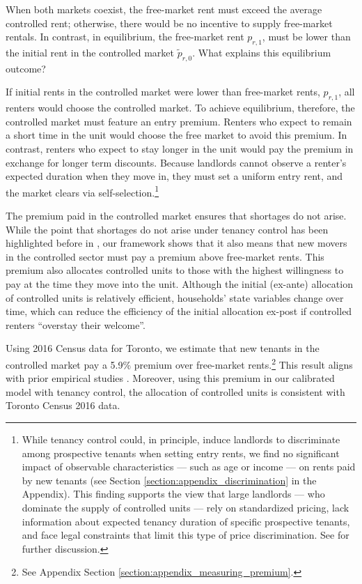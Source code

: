 \documentclass[parskip=full]{article}
\begin{document}
When both markets coexist, the free-market rent must exceed the average controlled rent; otherwise, there would be no incentive to supply free-market rentals. In contrast, in equilibrium, the free-market rent $p_{r,1}$, must be lower than the initial rent in the controlled market $\tilde{p}_{r,0}$. What explains this equilibrium outcome?

If initial rents in the controlled market were lower than free-market rents, $p_{r,1}$, all renters would choose the controlled market. To achieve equilibrium, therefore, the controlled market must feature an entry premium. Renters who expect to remain a short time in the unit would choose the free market to avoid this premium. In contrast, renters who expect to stay longer in the unit would pay the premium in exchange for longer term discounts. Because landlords cannot observe a renter's expected duration when they move in, they must set a uniform entry rent, and the market clears via self-selection.\footnote{While tenancy control could, in principle, induce landlords to discriminate among prospective tenants when setting entry rents, we find no significant impact of observable characteristics — such as age or income — on rents paid by new tenants (see Section \ref{section:appendix_discrimination} in the Appendix). This finding supports the view that large landlords — who dominate the supply of controlled units — rely on standardized pricing, lack information about expected tenancy duration of specific prospective tenants, and face legal constraints that limit this type of price discrimination. See \citet{be-2000} for further discussion.}

The premium paid in the controlled market ensures that shortages do not arise. While the point that shortages do not arise under tenancy control has been highlighted before in \citet{arnott-1995}, our framework shows that it also means that new movers in the controlled sector must pay a premium above free-market rents. This premium also allocates controlled units to those with the highest willingness to pay at the time they move into the unit. Although the initial (ex-ante) allocation of controlled units is relatively efficient, households' state variables change over time, which can reduce the efficiency of the initial allocation ex-post if controlled renters ``overstay their welcome''. 

Using 2016 Census data for Toronto, we estimate that new tenants in the controlled market pay a 5.9\% premium over free-market rents.\footnote{See Appendix Section \ref{section:appendix_measuring_premium}.} This result aligns with prior empirical studies \citep{nagy-1997,early-2000,cjq-2023}. Moreover, using this premium in our calibrated model with tenancy control, the allocation of controlled units is consistent with Toronto Census 2016 data.
\end{document}
